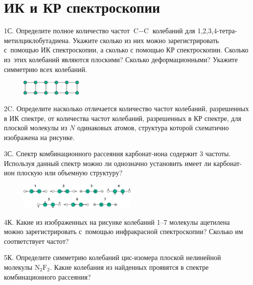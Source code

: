 \setmainfont{Noto Serif}
\setsansfont{Noto Sans}
\setmonofont{Noto Sans Mono}

\section{ИК и КР спектроскопии}
1С. Определите полное количество частот $\text{C}-\text{C}$ колебаний для 1,2,3,4-тетра-метилциклобутадиена. Укажите сколько из них можно зарегистрировать с~помощью ИК спектроскопии, а сколько с помощью КР спектроскопии. Сколько из~этих колебаний являются плоскими? Сколько деформационными? Укажите симметрию всех колебаний.
\par
\begin{figure} %
    \centering
    \vspace{-1.5ex}
    \includegraphics[width=30mm]{images/Fig_2_4_2.png}
    \vspace{-3ex}
\end{figure}
2C. Определите насколько отличается количество частот колебаний, разрешенных в ИК спектре, от количества частот колебаний, разрешенных в КР спектре, для плоской молекулы из $N$ одинаковых атомов, структура которой схематично изображена на рисунке.
\par
3С. Спектр комбинационного рассеяния карбонат-иона содержит 3 частоты. Используя данный спектр можно ли однозначно установить имеет ли карбонат-ион плоскую или объемную структуру?
\par
\begin{figure} %
    \centering
    \vspace{-1mm}
    \includegraphics[width=58mm]{images/Fig_2_4_4.png}
    \vspace{-6mm}
\end{figure}
4К. Какие из изображенных на рисунке колебаний 1–7 молекулы ацетилена можно зарегистрировать с~помощью инфракрасной спектроскопии? Сколько им соответствует частот?
\par
5К. Определите симметрию колебаний цис-изомера плоской нелинейной молекулы $\text{N}_2\text{F}_2$. Какие колебания из найденных проявятся в спектре комбинационного рассеяния?
